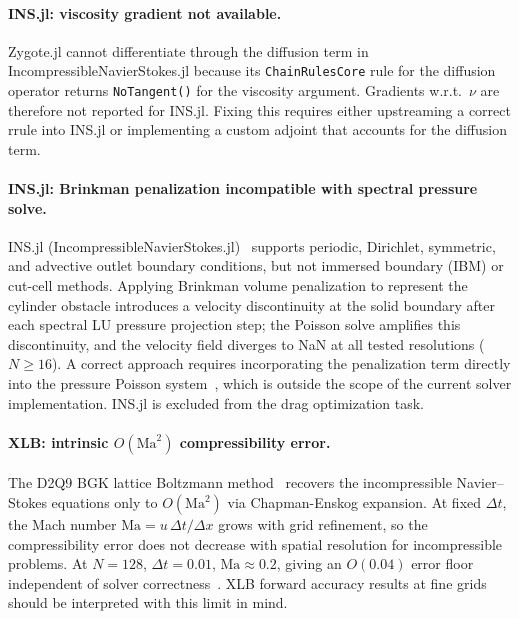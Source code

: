 \documentclass{article}
\begin{document}
\paragraph{INS.jl: viscosity gradient not available.}
Zygote.jl cannot differentiate through the diffusion term in
IncompressibleNavierStokes.jl because its \texttt{ChainRulesCore} rule for
the diffusion operator returns \texttt{NoTangent()} for the viscosity
argument. Gradients w.r.t.\ $\nu$ are therefore not reported for INS.jl.
Fixing this requires either upstreaming a correct rrule into INS.jl or
implementing a custom adjoint that accounts for the diffusion term.

\paragraph{INS.jl: Brinkman penalization incompatible with spectral pressure solve.}
INS.jl (IncompressibleNavierStokes.jl)~\cite{agdestein2024ins} supports periodic,
Dirichlet, symmetric, and advective outlet boundary conditions, but not
immersed boundary (IBM) or cut-cell methods. Applying Brinkman volume
penalization to represent the cylinder obstacle introduces a velocity
discontinuity at the solid boundary after each spectral LU pressure
projection step; the Poisson solve amplifies this discontinuity, and the
velocity field diverges to NaN at all tested resolutions ($N \geq 16$). A
correct approach requires incorporating the penalization term directly into
the pressure Poisson system~\cite{angot1999penalization}, which is outside
the scope of the current solver implementation. INS.jl is excluded from the
drag optimization task.

\paragraph{XLB: intrinsic $O(\mathrm{Ma}^2)$ compressibility error.}
The D2Q9 BGK lattice Boltzmann method~\cite{qian1992lattice} recovers the
incompressible Navier--Stokes equations only to $O(\mathrm{Ma}^2)$ via
Chapman-Enskog expansion. At fixed $\Delta t$, the Mach number
$\mathrm{Ma} = u\,\Delta t / \Delta x$ grows with grid refinement, so the
compressibility error does not decrease with spatial resolution for
incompressible problems. At $N = 128$, $\Delta t = 0.01$,
$\mathrm{Ma} \approx 0.2$, giving an $O(0.04)$ error floor independent of
solver correctness~\cite{ataei2024xlb}. XLB forward accuracy results at
fine grids should be interpreted with this limit in mind.
\end{document}
